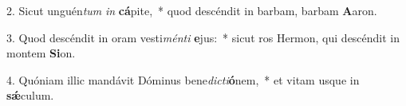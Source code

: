 2. Sicut unguén\textit{tum} \textit{in} \textbf{cá}pite,~*  quod descéndit in barbam, barbam \textbf{A}aron.\

3. Quod descéndit in oram vesti\textit{mén}\textit{ti} \textbf{e}jus:~*  sicut ros Hermon, qui descéndit in montem \textbf{Si}on.\

4. Quóniam illic mandávit Dóminus bene\textit{dic}\textit{ti}\textbf{ó}nem,~*  et vitam usque in \textbf{sǽ}culum.\

